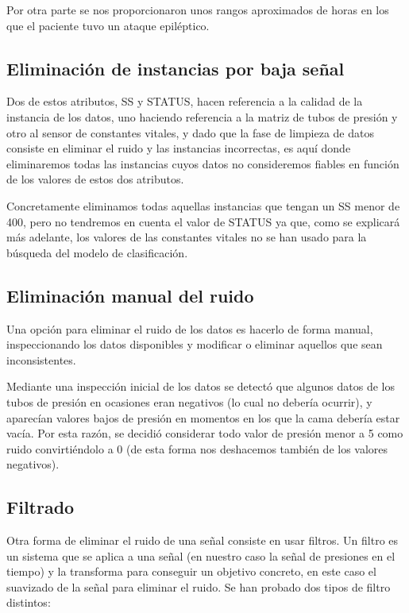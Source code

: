 Por otra parte se nos proporcionaron unos rangos aproximados de horas en los que el paciente tuvo un ataque epiléptico. 

\subsection{Eliminación de instancias por baja señal}

Dos de estos atributos, SS y STATUS, hacen referencia a la calidad de la instancia de los datos, uno haciendo referencia a la matriz de tubos de presión y otro al sensor de constantes vitales, y dado que la fase de limpieza de datos consiste en eliminar el ruido y las instancias incorrectas, es aquí donde eliminaremos todas las instancias cuyos datos no consideremos fiables en función de los valores de estos dos atributos. 

Concretamente eliminamos todas aquellas instancias que tengan un SS menor de 400, pero no tendremos en cuenta el valor de STATUS ya que, como se explicará más adelante, los valores de las constantes vitales no se han usado para la búsqueda del modelo de clasificación.

\subsection{Eliminación manual del ruido}

Una opción para eliminar el ruido de los datos es hacerlo de forma manual, inspeccionando los datos disponibles y modificar o eliminar aquellos que sean inconsistentes. 

Mediante una inspección inicial de los datos se detectó que algunos datos de los tubos de presión en ocasiones eran negativos (lo cual no debería ocurrir), y aparecían valores bajos de presión en momentos en los que la cama debería estar vacía. Por esta razón, se decidió considerar todo valor de presión menor a 5 como ruido convirtiéndolo a 0 (de esta forma nos deshacemos también de los valores negativos). 

\subsection{Filtrado}

Otra forma de eliminar el ruido de una señal consiste en usar filtros. Un filtro es un sistema que se aplica a una señal (en nuestro caso la señal de presiones en el tiempo) y la transforma para conseguir un objetivo concreto, en este caso el suavizado de la señal para eliminar el ruido. Se han probado dos tipos de filtro distintos: 

